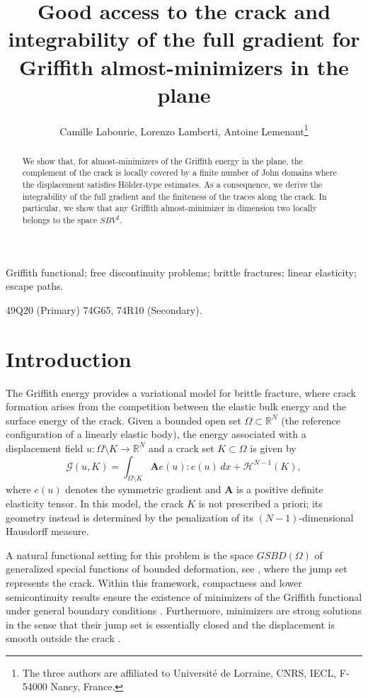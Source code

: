 \documentclass[12pt]{article}
\title{Good access to the crack and integrability of the full gradient for Griffith almost-minimizers in the plane}
\author{Camille Labourie, Lorenzo Lamberti, Antoine Lemenant\thanks{The three authors are affiliated to Université de Lorraine, CNRS, IECL, F-54000 Nancy, France.}}
\date{}
\theoremstyle{definition}
\theoremstyle{remark}
\numberwithin{equation}{section}
\renewcommand{\comment}[1]{\sethlcolor{commentcolor}\hl{#1}\sethlcolor{yellow}}
\newcommand{\R}{\mathbb{R}}
\newcommand{\A}{\mathbf{A}}
\renewcommand{\H}{\mathcal{H}}
\begin{document}
\maketitle


\begin{abstract}
    We show that, for almost-minimizers of the Griffith energy in the plane, the complement of the crack is locally
    covered by a finite number of John domains where the displacement satisfies Hölder-type estimates. 
      As a consequence, we derive the   integrability of the full gradient and the finiteness of the traces along the crack. In particular, we show that any Griffith almost-minimizer in dimension two locally belongs  to the space $SBV^2$. 
\end{abstract}
 
\bigskip

Griffith functional; free discontinuity problems; brittle fractures; linear elasticity; escape paths.

\smallskip

 49Q20 (Primary) 74G65, 74R10 (Secondary).

\tableofcontents

\section{Introduction}
The Griffith energy provides a variational model for brittle fracture, where crack formation arises from the competition
between the elastic bulk energy and the surface energy of the crack. Given a bounded open set $\Omega \subset \R^N$
(the reference configuration of a linearly elastic body), the energy associated with a displacement field
$u \colon \Omega \setminus K \longrightarrow \R^N$ and a crack set $K \subset \Omega$ is given by
\begin{equation}
    \mathcal{G}(u,K)
    = \int_{\Omega \setminus K} \A e(u) : e(u)\,dx + \H^{N-1}(K),
\end{equation}
where $e(u)$ denotes the symmetric gradient and $\A$ is a positive definite elasticity tensor. In this model, the crack $K$ is
not prescribed a priori; its geometry instead is determined by the penalization of its $(N-1)$-dimensional Hausdorff measure.

A natural functional setting for this problem is the space $GSBD(\Omega)$ of generalized
special functions of bounded deformation, see \cite{dalmaso}, where the jump set represents the crack.  Within this
framework, compactness and lower semicontinuity results ensure the existence of minimizers of the Griffith
functional under general boundary conditions \cite{ChambolleCrismaleGSBD, ChambolleCrismaleGSBD2}. Furthermore,
minimizers are strong solutions in the sense that their jump set is essentially closed and the displacement
is smooth outside the crack \cite{CFI, CCI, ChambolleCrismaleStrong, FLK2}.
\end{document}
